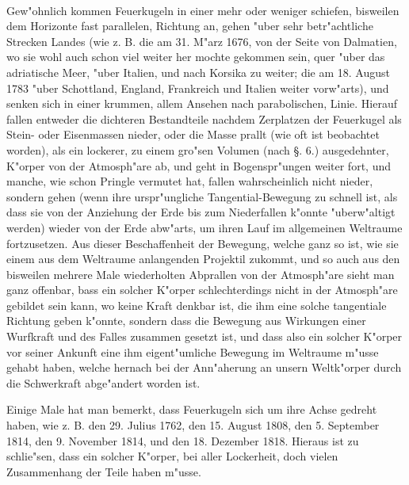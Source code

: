 \documentclass[a4paper, 11pt, oneside, polutonikogreek, german]{article}
\begin{document}
\paragraph{}
Gew"ohnlich kommen Feuerkugeln in einer mehr oder weniger schiefen, bisweilen dem Horizonte fast parallelen, Richtung an, gehen "uber sehr betr"achtliche Strecken Landes (wie z. B. die am 31. M"arz 1676, von der Seite von Dalmatien, wo sie wohl auch schon viel weiter her mochte gekommen sein, quer "uber das adriatische Meer, "uber Italien, und nach Korsika zu weiter; die am 18. August 1783 "uber Schottland, England, Frankreich und Italien weiter vorw"arts), und senken sich in einer krummen, allem Ansehen nach parabolischen, Linie. Hierauf fallen entweder die dichteren Bestandteile nachdem Zerplatzen der Feuerkugel als Stein- oder Eisenmassen nieder, oder die Masse prallt (wie oft ist beobachtet worden), als ein lockerer, zu einem gro"sen Volumen (nach §. 6.) ausgedehnter, K"orper von der Atmosph"are ab, und geht in Bogenspr"ungen weiter fort, und manche, wie schon Pringle vermutet hat, fallen wahrscheinlich nicht nieder, sondern gehen (wenn ihre urspr"ungliche Tangential-Bewegung zu schnell ist, als dass sie von der Anziehung der Erde bis zum Niederfallen k"onnte "uberw"altigt werden) wieder von der Erde abw"arts, um ihren Lauf im allgemeinen Weltraume fortzusetzen. Aus dieser Beschaffenheit der Bewegung, welche ganz so ist, wie sie einem aus dem Weltraume anlangenden Projektil zukommt, und so auch aus den bisweilen mehrere Male wiederholten Abprallen von der Atmosph"are sieht man ganz offenbar, bass ein solcher K"orper schlechterdings nicht in der Atmosph"are gebildet sein kann, wo keine Kraft denkbar ist, die ihm eine solche tangentiale Richtung geben k"onnte, sondern dass die Bewegung aus Wirkungen einer Wurfkraft und des Falles zusammen gesetzt ist, und dass also ein solcher K"orper vor seiner Ankunft eine ihm eigent"umliche Bewegung im Weltraume m"usse gehabt haben, welche hernach bei der Ann"aherung an unsern Weltk"orper durch die Schwerkraft abge"andert worden ist.

Einige Male hat man bemerkt, dass Feuerkugeln sich um ihre Achse gedreht haben, wie z. B. den 29. Julius 1762, den 15. August 1808, den 5. September 1814, den 9. November 1814, und den 18. Dezember 1818. Hieraus ist zu schlie"sen, dass ein solcher K"orper, bei aller Lockerheit, doch vielen Zusammenhang der Teile haben m"usse.
\end{document}
